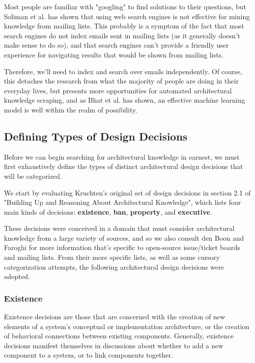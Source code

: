 \documentclass[a4paper, 12pt]{article}
\begin{document}
		Most people are familiar with "googling" to find solutions to their questions, but Soliman et al. has shown that using web search engines is not effective for mining knowledge from mailing lists\cite{soliman}. This probably is a symptom of the fact that most search engines do not index emails sent in mailing lists (as it generally doesn't make sense to do so), and that search engines can't provide a friendly user experience for navigating results that would be shown from mailing lists.
		
		Therefore, we'll need to index and search over emails independently. Of course, this detaches the research from what the majority of people are doing in their everyday lives, but presents more opportunities for automated architectural knowledge scraping, and as Bhat et al. has shown, an effective machine learning model is well within the realm of possibility\cite{bhat}.
		
	\subsection{Defining Types of Design Decisions}
		\label{sec:design-decisions}
		Before we can begin searching for architectural knowledge in earnest, we must first exhaustively define the types of distinct architectural design decisions that will be categorized.
		
		We start by evaluating Kruchten's original set of design decisions in section 2.1 of "Building Up and Reasoning About Architectural Knowledge"\cite{kruchten}, which lists four main kinds of decisions: \textbf{existence}, \textbf{ban}, \textbf{property}, and \textbf{executive}.
		
		These decisions were conceived in a domain that must consider architectural knowledge from a large variety of sources, and so we also consult den Boon\cite{denboon} and Faroghi\cite{faroghi} for more information that's specific to open-source issue/ticket boards and mailing lists. From their more specific lists, as well as some cursory categorization attempts, the following architectural design decisions were adopted.
		
		\subsubsection{\textbf{Existence}}
			Existence decisions are those that are concerned with the creation of new elements of a system's conceptual or implementation architecture, or the creation of behavioral connections between existing components. Generally, existence decisions manifest themselves in discussions about whether to add a new component to a system, or to link components together.
			
\end{document}
